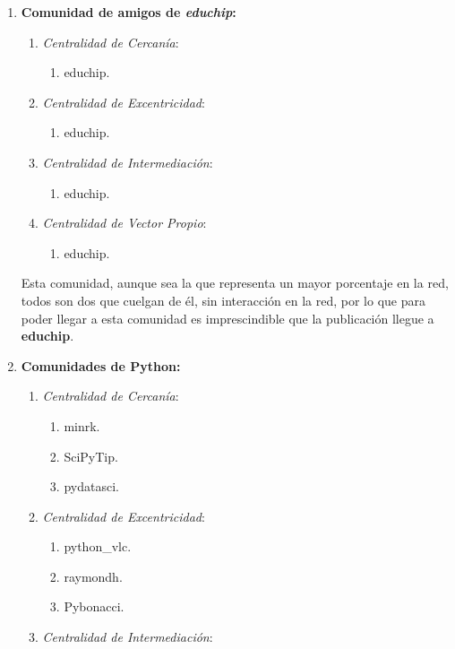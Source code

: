\documentclass[paper=a4, fontsize=11pt]{article} %
\numberwithin{equation}{section} %
\numberwithin{figure}{section} %
\numberwithin{table}{section} %
\begin{document}
\begin{enumerate}[$\bullet$]
  \item \textbf{Comunidad de amigos de \textit{educhip}:}
  \begin{enumerate}[---]
    \item \textit{Centralidad de Cercanía}:
    \begin{enumerate}
      \item educhip.
    \end{enumerate}
    \item \textit{Centralidad de Excentricidad}:
    \begin{enumerate}
      \item educhip.
    \end{enumerate}
    \item \textit{Centralidad de Intermediación}:
    \begin{enumerate}
      \item educhip.
    \end{enumerate}
    \item \textit{Centralidad de Vector Propio}:
    \begin{enumerate}
      \item educhip.
    \end{enumerate}
  \end{enumerate}
  Esta comunidad, aunque sea la que representa un mayor porcentaje en la red, todos son dos que cuelgan de él, sin interacción en la red, por lo que para poder llegar a esta comunidad es imprescindible que la publicación llegue a \textbf{educhip}.
  \item \textbf{Comunidades de Python:}
  \begin{enumerate}[---]
    \item \textit{Centralidad de Cercanía}:
    \begin{enumerate}
      \item minrk.
      \item SciPyTip.
      \item pydatasci.
    \end{enumerate}
    \item \textit{Centralidad de Excentricidad}:
    \begin{enumerate}
      \item python\_vlc.
      \item raymondh.
      \item Pybonacci.
    \end{enumerate}
    \item \textit{Centralidad de Intermediación}:

\end{enumerate}
\end{enumerate}
\end{document}
